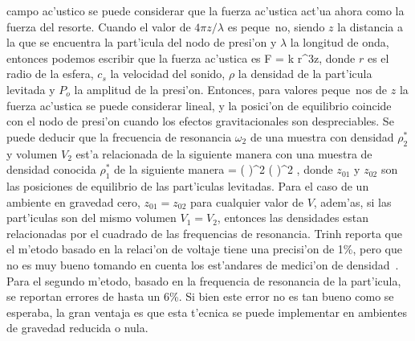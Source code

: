 campo ac'ustico se puede considerar que la fuerza ac'ustica act'ua ahora como la fuerza del resorte. Cuando 
el valor de $4\pi z/\lambda$ es peque~no, siendo $z$ la distancia a la que se encuentra la part'icula del
nodo de presi'on y $\lambda$ la longitud de onda, entonces podemos escribir que la fuerza ac'ustica es
\BE
F = k r^3z,
\EE
donde $r$ es el radio de la esfera, $c_s$ la velocidad del sonido, $\rho$ la densidad de la part'icula
levitada y $P_o$ la amplitud de la presi'on. Entonces, para valores peque~nos de $z$ la fuerza ac'ustica
se puede considerar lineal, y la posici'on de equilibrio coincide con el nodo de presi'on cuando los efectos
gravitacionales son despreciables. Se puede deducir que la frecuencia de resonancia $\omega_2$ de una muestra con 
densidad  $\rho_2^\ast$ y volumen $V_2$ est'a relacionada de la siguiente manera con una muestra de densidad
conocida $\rho_1^\ast$ de la siguiente manera
\BE
{} = \left(  \right)^2 \left(  \right)^2
,
\EE
donde $z_{01}$ y $z_{02}$ son las posiciones de equilibrio de las part'iculas levitadas. Para el caso de un ambiente
en gravedad cero, $z_{01}=z_{02}$ para cualquier valor de $V$, adem'as, si las part'iculas son del mismo
volumen $V_1 = V_2$, entonces las densidades estan relacionadas por el cuadrado de las frequencias de resonancia. 
Trinh reporta que el m'etodo basado en la relaci'on de voltaje tiene una precisi'on de 1\%, pero que no es muy bueno
tomando en cuenta los est'andares de medici'on de densidad~\cite{trinh86}.  Para el segundo m'etodo, basado en la
frequencia de resonancia de la part'icula, se reportan errores de hasta un 6\%.  Si bien este error no es tan bueno
como se esperaba, la gran ventaja es que esta t'ecnica se puede implementar en ambientes de gravedad reducida
o nula.

